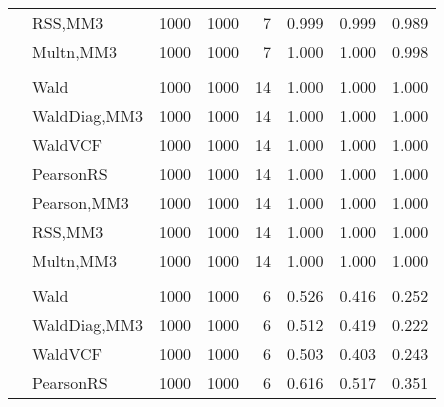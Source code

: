 \documentclass[
]{article}
\begin{document}
\begin{table}[H]
{\begin{tabular}[t]{llrrrrrr}
\hspace{1em} & RSS,MM3 & 1000 & 1000 & 7 & 0.999 & 0.999 & 0.989\\

\hspace{1em} & Multn,MM3 & 1000 & 1000 & 7 & 1.000 & 1.000 & 0.998\\
\cmidrule{1-8}
\addlinespace[0.3em]
\multicolumn{8}{l}{\textbf{1F 15V}}\\
\hspace{1em} & Wald & 1000 & 1000 & 14 & 1.000 & 1.000 & 1.000\\

\hspace{1em} & WaldDiag,MM3 & 1000 & 1000 & 14 & 1.000 & 1.000 & 1.000\\

\hspace{1em} & WaldVCF & 1000 & 1000 & 14 & 1.000 & 1.000 & 1.000\\

\hspace{1em} & PearsonRS & 1000 & 1000 & 14 & 1.000 & 1.000 & 1.000\\

\hspace{1em} & Pearson,MM3 & 1000 & 1000 & 14 & 1.000 & 1.000 & 1.000\\

\hspace{1em} & RSS,MM3 & 1000 & 1000 & 14 & 1.000 & 1.000 & 1.000\\

\hspace{1em} & Multn,MM3 & 1000 & 1000 & 14 & 1.000 & 1.000 & 1.000\\
\cmidrule{1-8}
\addlinespace[0.3em]
\multicolumn{8}{l}{\textbf{2F 10V}}\\
\hspace{1em} & Wald & 1000 & 1000 & 6 & 0.526 & 0.416 & 0.252\\

\hspace{1em} & WaldDiag,MM3 & 1000 & 1000 & 6 & 0.512 & 0.419 & 0.222\\

\hspace{1em} & WaldVCF & 1000 & 1000 & 6 & 0.503 & 0.403 & 0.243\\

\hspace{1em} & PearsonRS & 1000 & 1000 & 6 & 0.616 & 0.517 & 0.351\\


\end{tabular}}
\end{table}
\end{document}
